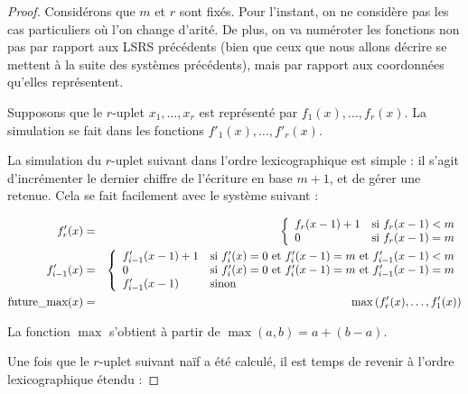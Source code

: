 \begin{proof}
			Considérons que $m$ et $r$ sont fixés. Pour l'instant, on ne considère pas les cas particuliers où l'on change d'arité. De plus, on va numéroter les fonctions non pas par rapport aux LSRS précédents (bien que ceux que nous allons décrire se mettent à la suite des systèmes précédents), mais par rapport aux coordonnées qu'elles représentent. 
			
			Supposons que le $r$-uplet $x_1, \dots, x_r$ est représenté par $f_{1}(x), \dots, f_{r}(x)$. La simulation se fait dans les fonctions $f'_{1}(x), \dots, f'_{r}(x)$. 
			
			La simulation du $r$-uplet suivant dans l'ordre lexicographique est simple : il s'agit d'incrémenter le dernier chiffre de l'écriture en base $m+1$, et de gérer une retenue. Cela se fait facilement avec le système suivant :
			
			\begin{eqnarray}
				f'_{r}(x) & = &\left\lbrace \begin{array}{ll} 
									f_r(x-1)+1 & \text{si $f_r(x-1) < m$} \\
									0 & \text{si $f_r(x-1) = m$}
								 \end{array} \right.\\
				f'_{i-1}(x) & = & \left\lbrace \begin{array}{ll} 
									f'_{i-1}(x-1)+1 & \text{si $f'_{i}(x) = 0$ et $f'_{i}(x-1) = m$ et $f'_{i-1}(x-1) < m$} \\
									0 & \text{si $f'_{i}(x) = 0$ et $f'_{i}(x-1) = m$ et $f'_{i-1}(x-1) = m$} \\
									f'_{i-1}(x-1) & \text{sinon}
								 \end{array} \right. \\
				\text{future\_max}(x) & = & \max\left(f'_{r}(x), \dots, f'_{1}(x)\right)
			\end{eqnarray}
			
			La fonction $\max$ s'obtient à partir de $\max\left(a, b\right) = a + (b-a)$. 
						
			Une fois que le $r$-uplet suivant naïf a été calculé, il est temps de revenir à l'ordre lexicographique étendu :
			

\end{proof}
